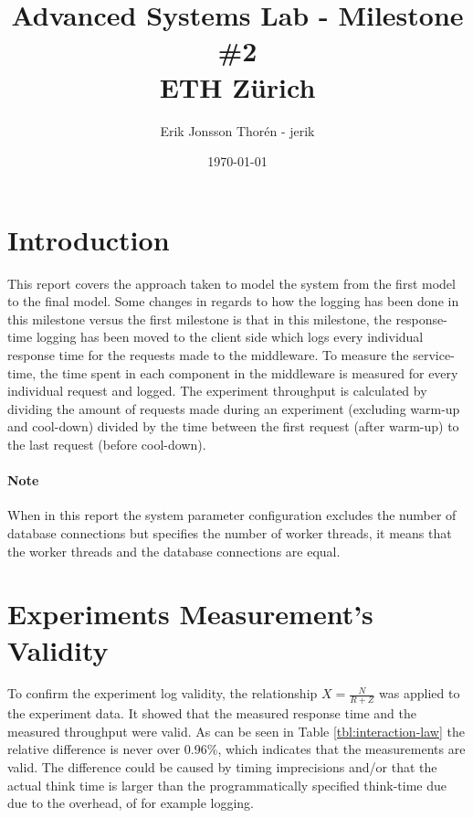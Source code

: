 \documentclass[a4paper, 11pt]{article}
\title{Advanced Systems Lab - Milestone \#2\\
\small{ETH Zürich}}
\author{Erik Jonsson Thor\'en - jerik\\}
\date{\today}
\begin{document}
\maketitle
\tableofcontents
\newpage


\section{Introduction}
This report covers the approach taken to model the system from the first model to the final model. Some changes in regards to how the logging has been done in this milestone versus the first milestone is that in this milestone, the response-time logging has been moved to the client side which logs every individual response time for the requests made to the middleware. To measure the service-time, the time spent in each component in the middleware is measured for every individual request and logged. The experiment throughput is calculated by dividing the amount of requests made during an experiment (excluding warm-up and cool-down) divided by the time between the first request (after warm-up) to the last request (before cool-down).

\paragraph{Note} When in this report the system parameter configuration excludes the number of database connections but specifies the number of worker threads, it means that the worker threads and the database connections are equal.

\section{Experiments Measurement's Validity}
	To confirm the experiment log validity, the relationship $X=\frac{N}{R+Z}$ was applied to the experiment data. It showed that the measured response time and the measured throughput were valid. As can be seen in Table \ref{tbl:interaction-law} the relative difference is never over 0.96\%, which indicates that the measurements are valid. The difference could be caused by timing imprecisions and/or that the actual think time is larger than the programmatically specified think-time due due to the overhead, of for example logging.
\end{document}
